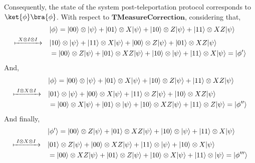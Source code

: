 Consequently, the state of the system post-teleportation protocol corresponds to $\ket{\phi}\bra{\phi}$. With respect to $\textbf{TMeasureCorrection}$, considering that,
\begin{equation}
  \begin{split}
     & |\phi\rangle = |00\rangle \otimes |\psi\rangle  + |01\rangle \otimes X|\psi\rangle + |10\rangle \otimes Z |\psi\rangle + |11\rangle \otimes XZ|\psi\rangle \\
      \xmapsto{ \hspace{3pt} X \otimes I \otimes I \hspace{3pt} } \quad &  |10\rangle \otimes |\psi\rangle  + |11\rangle \otimes X|\psi\rangle + |00\rangle \otimes Z |\psi\rangle + |01\rangle \otimes XZ|\psi\rangle \\
      & = |00\rangle \otimes Z |\psi\rangle + |01\rangle \otimes XZ|\psi\rangle + |10\rangle \otimes |\psi\rangle  + |11\rangle \otimes X|\psi\rangle = |\phi'\rangle
  \end{split}
  \end{equation}
And,
\begin{equation}
  \begin{split}
     & |\phi\rangle = |00\rangle \otimes |\psi\rangle  + |01\rangle \otimes X|\psi\rangle + |10\rangle \otimes Z |\psi\rangle + |11\rangle \otimes XZ|\psi\rangle \\
      \xmapsto{ \hspace{3pt} I \otimes X \otimes I \hspace{3pt} } \quad &  |01\rangle \otimes |\psi\rangle  + |00\rangle \otimes X|\psi\rangle + |11\rangle \otimes Z |\psi\rangle + |10\rangle \otimes XZ|\psi\rangle \\
      & = |00\rangle \otimes X|\psi\rangle + |01\rangle \otimes |\psi\rangle + |10\rangle \otimes XZ |\psi\rangle + |11\rangle \otimes Z|\psi\rangle = |\phi''\rangle
  \end{split}
  \end{equation}
  And finally,
  \begin{equation}
  \begin{split}
     & |\phi'\rangle = |00\rangle \otimes Z |\psi\rangle + |01\rangle \otimes XZ|\psi\rangle + |10\rangle \otimes |\psi\rangle  + |11\rangle \otimes X|\psi\rangle \\
     \xmapsto{ \hspace{3pt} I \otimes X \otimes I \hspace{3pt} } \quad & |01\rangle \otimes Z |\psi\rangle + |00\rangle \otimes XZ|\psi\rangle + |11\rangle \otimes |\psi\rangle + |10\rangle \otimes X|\psi\rangle \\
      & = |00\rangle \otimes XZ|\psi\rangle + |01\rangle \otimes Z|\psi\rangle + |10\rangle \otimes X|\psi\rangle + |11\rangle \otimes |\psi\rangle = |\phi'''\rangle
  \end{split}
  \end{equation}
